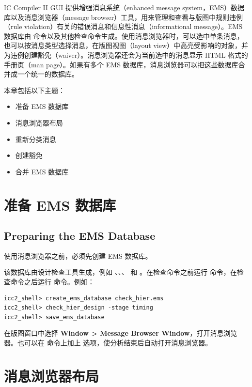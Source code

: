 \label{chap:gui-msg}

IC Compiler II GUI 提供增强消息系统（enhanced message system，EMS）数据库以及消息浏览器（message browser）工具，用来管理和查看与版图中规则违例（rule violation）有关的错误消息和信息性消息（informational message）。EMS 数据库由  命令以及其他检查命令生成。使用消息浏览器时，可以选中单条消息，也可以按消息类型选择消息，在版图视图（layout view）中高亮受影响的对象，并为违例创建豁免（waiver）。消息浏览器还会为当前选中的消息显示 HTML 格式的手册页（man page）。如果有多个 EMS 数据库，消息浏览器可以把这些数据库合并成一个统一的数据库。

本章包括以下主题：
\begin{itemize}
  \item 准备 EMS 数据库
  \item 消息浏览器布局
  \item 重新分类消息
  \item 创建豁免
  \item 合并 EMS 数据库
\end{itemize}

\section{准备 EMS 数据库}
\subsection*{Preparing the EMS Database}

使用消息浏览器之前，必须先创建 EMS 数据库。

该数据库由设计检查工具生成，例如 、、、 和 。在检查命令之前运行  命令，在检查命令之后运行  命令。例如：
\begin{lstlisting}
icc2_shell> create_ems_database check_hier.ems
icc2_shell> check_hier_design -stage timing
icc2_shell> save_ems_database
\end{lstlisting}

在版图窗口中选择 \textbf{Window > Message Browser Window}，打开消息浏览器。也可以在  命令上加上  选项，使分析结束后自动打开消息浏览器。

\section{消息浏览器布局}
